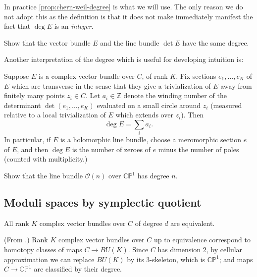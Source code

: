 \documentclass[12pt,letterpaper,reqno]{article}
\numberwithin{equation}{section}
\newcommand{\cO}{\ensuremath{\mathcal O}}
\newcommand{\C}{\ensuremath{\mathbb C}}
\newcommand{\PP}{\ensuremath{\mathbb P}}
\newcommand{\Z}{\ensuremath{\mathbb Z}}
\newcommand{\ti}[1]{\textit{#1}}
\begin{document}
In practice \autoref{prop:chern-weil-degree} is what we will use.
The only reason we do not adopt this as the definition is that
it does not make immediately manifest the fact that $\deg E$ is an
\ti{integer}.

\begin{exercise} Show that the vector bundle $E$ and the line bundle $\det E$
have the same degree.
\end{exercise}

Another interpretation of the degree which is useful for developing
intuition is:
\begin{prop} Suppose $E$ is a complex vector bundle over $C$, of rank $K$.
Fix sections $e_1, \dots, e_K$ of $E$ which are transverse in the sense
that they give a trivialization of $E$ away from finitely many points
$z_i \in C$. Let $a_i \in \Z$ denote the winding
number of the determinant $\det(e_1, \dots, e_K)$ evaluated
on a small circle around $z_i$ (measured relative to a local trivialization
of $E$ which extends over $z_i$). Then
\begin{equation}
  \deg E = \sum_i a_i.
\end{equation}
In particular, if $E$ is a holomorphic line bundle, choose a meromorphic
section $e$ of $E$, and then $\deg E$ is the number of zeroes of $e$
minus the number of poles (counted with multiplicity.)
\end{prop}

\begin{exercise} Show that the line bundle $\cO(n)$ over $\C\PP^1$
has degree $n$.
\end{exercise}


\subsection{Moduli spaces by symplectic quotient}

\begin{prop}
All rank $K$ complex vector bundles over $C$ of degree $d$ are equivalent.
\end{prop}

\begin{pf} (From \cite{MR98b:14010}.) Rank $K$
complex vector bundles over $C$ up to equivalence correspond
to homotopy classes of maps $C \to BU(K)$. Since $C$ has dimension $2$,
by cellular approximation
we can replace $BU(K)$ by its 3-skeleton, which is $\C\PP^1$;
and maps $C \to \C\PP^1$ are classified by their degree.
\end{pf}
\end{document}
